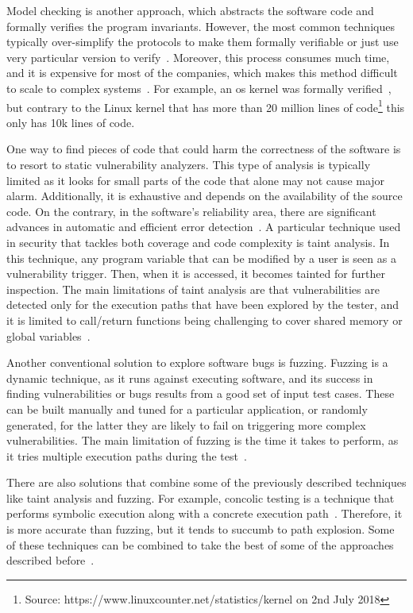 Model checking is another approach, which abstracts the software code and formally verifies the program invariants.
However, the most common techniques typically over-simplify the protocols to make them formally verifiable or just use very particular version to verify~\cite{Klein:2009,Chen:2015,Nelson:2017}. 
Moreover, this process consumes much time, and it is expensive for most of the companies, which makes this method difficult to scale to complex systems~\cite{Giuffrida:2013}.
For example, an \gls{os} kernel was formally verified~\cite{Klein:2009}, but contrary to the Linux kernel that has more than 20 million lines of code\footnote{Source: https://www.linuxcounter.net/statistics/kernel on 2nd July 2018} this only has 10k lines of code.


One way to find pieces of code that could harm the correctness of the software is to resort to static vulnerability analyzers.
This type of analysis is typically limited as it looks for small parts of the code that alone may not cause major alarm.
Additionally, it is exhaustive and depends on the availability of the source code.
On the contrary, in the software's reliability area, there are significant advances in automatic and efficient error detection~\cite{Xu:2016}.
A particular technique used in security that tackles both coverage and code complexity is taint analysis.
In this technique, any program variable that can be modified by a user is seen as a vulnerability trigger. 
Then, when it is accessed, it becomes tainted for further inspection.
The main limitations of taint analysis are that vulnerabilities are detected only for the execution paths that have been explored by the tester, and it is limited to call/return functions being challenging to cover shared memory or global variables~\cite{Yamaguchi:2015}.


Another conventional solution to explore software bugs is fuzzing.
Fuzzing is a dynamic technique, as it runs against executing software, and its success in finding vulnerabilities or bugs results from a good set of input test cases.
These can be built manually and tuned for a particular application, or randomly generated, for the latter they are likely to fail on triggering more complex vulnerabilities.
The main limitation of fuzzing is the time it takes to perform, as it tries multiple execution paths during the test~\cite{Gan:2018}.


There are also solutions that combine some of the previously described techniques like taint analysis and fuzzing.
For example, concolic testing is a technique that performs symbolic execution along with a concrete execution path~\cite{Kim:2017}. 
Therefore, it is more accurate than fuzzing, but it tends to succumb to path explosion.
Some of these techniques can be combined to take the best of some of the approaches described before~\cite{Stephens:2016}.


